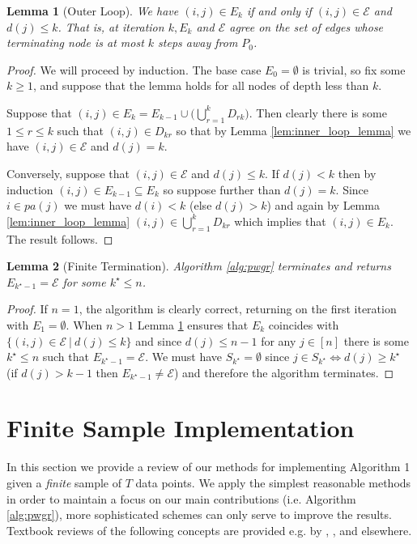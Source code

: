 \documentclass{statsoc}
\def\gcge{\mathcal{E}}  %
\newcommand{\pa}[1]{pa(#1)}  %
\newtheorem{lemma}{Lemma}
\begin{document}
\begin{lemma}[Outer Loop]
  \label{lem:outer_loop_lemma}
  We have $(i, j) \in E_k$ if and only if $(i, j) \in \gcge$ and
  $d(j) \le k$.  That is, at iteration $k, E_k$ and $\gcge$ agree on
  the set of edges whose terminating node is at most $k$ steps away
  from $P_0$.
\end{lemma}
\begin{proof}
  We will proceed by induction.  The base case $E_0 = \emptyset$ is
  trivial, so fix some $k \ge 1$, and suppose that the lemma holds for
  all nodes of depth less than $k$.

  Suppose that
  $(i, j) \in E_k = E_{k - 1}\cup \big(\bigcup_{r = 1}^k D_{rk}
  \big)$.  Then clearly there is some $1 \le r \le k$ such that
  $(i, j) \in D_{kr}$ so that by Lemma \ref{lem:inner_loop_lemma} we
  have $(i, j) \in \gcge$ and $d(j) = k$.

  Conversely, suppose that $(i, j) \in \gcge$ and $d(j) \le k$.  If
  $d(j) < k$ then by induction $(i, j) \in E_{k - 1} \subseteq E_k$ so
  suppose further than $d(j) = k$.  Since $i \in \pa{j}$ we must have
  $d(i) < k$ (else $d(j) > k$) and again by Lemma
  \ref{lem:inner_loop_lemma} $(i, j) \in \bigcup_{r = 1}^k D_{kr}$
  which implies that $(i, j) \in E_k$.  The result follows.
\end{proof}

\begin{lemma}[Finite Termination]
  Algorithm \ref{alg:pwgr} terminates and returns $E_{k^\star - 1} = \gcge$
  for some $k^\star \le n$.
\end{lemma}
\begin{proof}
  If $n = 1$, the algorithm is clearly correct, returning on the first
  iteration with $E_1 = \emptyset$.  When $n > 1$ Lemma
  \ref{lem:outer_loop_lemma} ensures that $E_k$ coincides with
  $\{(i, j) \in \gcge\ |\ d(j) \le k\}$ and since $d(j) \le n - 1$ for
  any $j \in [n]$ there is some $k^\star \le n$ such that
  $E_{k^\star - 1} = \gcge$.  We must have $S_{k^\star} = \emptyset$
  since $j \in S_{k^\star} \iff d(j) \ge k^\star$ (if $d(j) > k - 1$ then
  $E_{k^\star - 1} \ne \gcge$) and therefore the algorithm terminates.
\end{proof}

\section{Finite Sample Implementation}
\label{sec:structure_learning}
In this section we provide a review of our methods for implementing
Algorithm 1 given a \textit{finite} sample of $T$ data points.  We
apply the simplest reasonable methods in order to maintain a focus on
our main contributions (i.e. Algorithm \ref{alg:pwgr}), more
sophisticated schemes can only serve to improve the results.  Textbook
reviews of the following concepts are provided e.g. by
\cite{all_of_statistics}, \cite{murphy_mlp}, and elsewhere.
\end{document}
